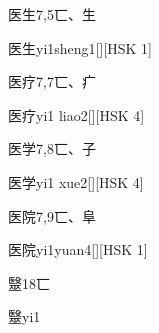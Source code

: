 \begin{entry}{医生}{7,5}{⼖、⽣}
  \begin{phonetics}{医生}{yi1sheng1}[][HSK 1]
  \end{phonetics}
\end{entry}

\begin{entry}{医疗}{7,7}{⼖、⽧}
  \begin{phonetics}{医疗}{yi1 liao2}[][HSK 4]
  \end{phonetics}
\end{entry}

\begin{entry}{医学}{7,8}{⼖、⼦}
  \begin{phonetics}{医学}{yi1 xue2}[][HSK 4]
  \end{phonetics}
\end{entry}

\begin{entry}{医院}{7,9}{⼖、⾩}
  \begin{phonetics}{医院}{yi1yuan4}[][HSK 1]
  \end{phonetics}
\end{entry}

\begin{entry}{毉}{18}{⼖}
  \begin{phonetics}{毉}{yi1}
  \end{phonetics}
\end{entry}


